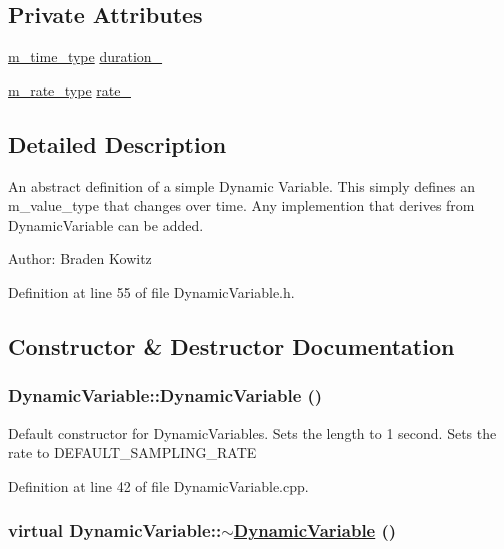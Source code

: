 \subsection*{Private Attributes}
\begin{CompactItemize}
\item 
\hyperlink{Types_8h_a2}{m\_\-time\_\-type} \hyperlink{classDynamicVariable_r0}{duration\_\-}
\item 
\hyperlink{Types_8h_a4}{m\_\-rate\_\-type} \hyperlink{classDynamicVariable_r1}{rate\_\-}
\end{CompactItemize}


\subsection{Detailed Description}
An abstract definition of a simple Dynamic Variable. This simply defines an m\_\-value\_\-type that changes over time. Any implemention that derives from Dynamic\-Variable can be added. \begin{Desc}
\item[Author:]Braden Kowitz \end{Desc}




Definition at line 55 of file Dynamic\-Variable.h.

\subsection{Constructor \& Destructor Documentation}
\hypertarget{classDynamicVariable_a0}{
\subsubsection[DynamicVariable]{\setlength{\rightskip}{0pt plus 5cm}Dynamic\-Variable::Dynamic\-Variable ()}}
\label{classDynamicVariable_a0}


Default constructor for Dynamic\-Variables. Sets the length to 1 second. Sets the rate to DEFAULT\_\-SAMPLING\_\-RATE 

Definition at line 42 of file Dynamic\-Variable.cpp.\hypertarget{classDynamicVariable_a1}{
\subsubsection[$\sim$DynamicVariable]{\setlength{\rightskip}{0pt plus 5cm}virtual Dynamic\-Variable::$\sim$\hyperlink{classDynamicVariable}{Dynamic\-Variable} ()}}
\label{classDynamicVariable_a1}


